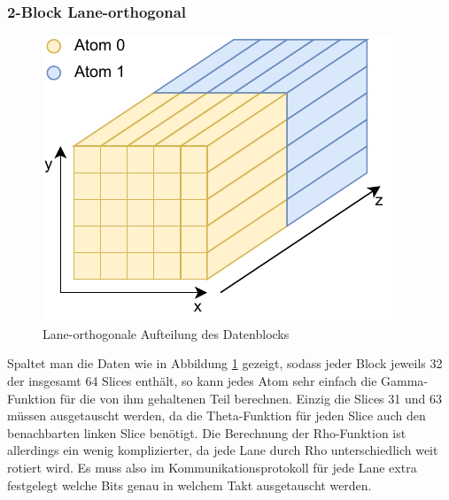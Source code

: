 \subsubsection{2-Block Lane-orthogonal}
\begin{figure}
    \center
    \includegraphics{images/Laneorthogonal.pdf}
    \caption{Lane-orthogonale Aufteilung des Datenblocks}
    \label{fig:2_block_laneorthogonal}
\end{figure}
Spaltet man die Daten wie in Abbildung \ref{fig:2_block_laneorthogonal} gezeigt, sodass jeder Block jeweils 32 der insgesamt 64 Slices enthält,
so kann jedes Atom sehr einfach die Gamma-Funktion für die von ihm gehaltenen Teil berechnen. Einzig die Slices 31 und 63 müssen ausgetauscht werden,
da die Theta-Funktion für jeden Slice auch den benachbarten linken Slice benötigt. Die Berechnung der Rho-Funktion ist allerdings ein wenig komplizierter,
da jede Lane durch Rho unterschiedlich weit rotiert wird. Es muss also im Kommunikationsprotokoll für jede Lane extra festgelegt welche Bits genau in welchem
Takt ausgetauscht werden.

